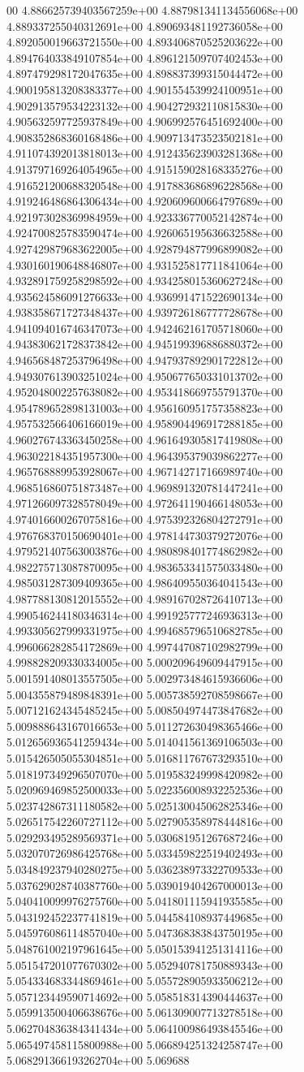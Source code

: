 00	4.886625739403567259e+00	4.887981341134556068e+00	4.889337255040312691e+00	4.890693481192736058e+00	4.892050019663721550e+00	4.893406870525203622e+00	4.894764033849107854e+00	4.896121509707402453e+00	4.897479298172047635e+00	4.898837399315044472e+00	4.900195813208383377e+00	4.901554539924100951e+00	4.902913579534223132e+00	4.904272932110815830e+00	4.905632597725937849e+00	4.906992576451692400e+00	4.908352868360168486e+00	4.909713473523502181e+00	4.911074392013818013e+00	4.912435623903281368e+00	4.913797169264054965e+00	4.915159028168335276e+00	4.916521200688320548e+00	4.917883686896228568e+00	4.919246486864306434e+00	4.920609600664797689e+00	4.921973028369984959e+00	4.923336770052142874e+00	4.924700825783590474e+00	4.926065195636632588e+00	4.927429879683622005e+00	4.928794877996899082e+00	4.930160190648846807e+00	4.931525817711841064e+00	4.932891759258298592e+00	4.934258015360627248e+00	4.935624586091276633e+00	4.936991471522690134e+00	4.938358671727348437e+00	4.939726186777728678e+00	4.941094016746347073e+00	4.942462161705718060e+00	4.943830621728373842e+00	4.945199396886880372e+00	4.946568487253796498e+00	4.947937892901722812e+00	4.949307613903251024e+00	4.950677650331013702e+00	4.952048002257638082e+00	4.953418669755791370e+00	4.954789652898131003e+00	4.956160951757358823e+00	4.957532566406166019e+00	4.958904496917288185e+00	4.960276743363450258e+00	4.961649305817419808e+00	4.963022184351957300e+00	4.964395379039862277e+00	4.965768889953928067e+00	4.967142717166989740e+00	4.968516860751873487e+00	4.969891320781447241e+00	4.971266097328578049e+00	4.972641190466148053e+00	4.974016600267075816e+00	4.975392326804272791e+00	4.976768370150690401e+00	4.978144730379272076e+00	4.979521407563003876e+00	4.980898401774862982e+00	4.982275713087870095e+00	4.983653341575033480e+00	4.985031287309409365e+00	4.986409550364041543e+00	4.987788130812015552e+00	4.989167028726410713e+00	4.990546244180346314e+00	4.991925777246936313e+00	4.993305627999331975e+00	4.994685796510682785e+00	4.996066282854172869e+00	4.997447087102982799e+00	4.998828209330334005e+00	5.000209649609447915e+00	5.001591408013557505e+00	5.002973484615936606e+00	5.004355879489848391e+00	5.005738592708598667e+00	5.007121624345485245e+00	5.008504974473847682e+00	5.009888643167016653e+00	5.011272630498365466e+00	5.012656936541259434e+00	5.014041561369106503e+00	5.015426505055304851e+00	5.016811767673293510e+00	5.018197349296507070e+00	5.019583249998420982e+00	5.020969469852500033e+00	5.022356008932252536e+00	5.023742867311180582e+00	5.025130045062825346e+00	5.026517542260727112e+00	5.027905358978444816e+00	5.029293495289569371e+00	5.030681951267687246e+00	5.032070726986425768e+00	5.033459822519402493e+00	5.034849237940280275e+00	5.036238973322709533e+00	5.037629028740387760e+00	5.039019404267000013e+00	5.040410099976275760e+00	5.041801115941935585e+00	5.043192452237741819e+00	5.044584108937449685e+00	5.045976086114857040e+00	5.047368383843750195e+00	5.048761002197961645e+00	5.050153941251314116e+00	5.051547201077670302e+00	5.052940781750889343e+00	5.054334683344869461e+00	5.055728905933506212e+00	5.057123449590714692e+00	5.058518314390444637e+00	5.059913500406638676e+00	5.061309007713278518e+00	5.062704836384341434e+00	5.064100986493845546e+00	5.065497458115800988e+00	5.066894251324258747e+00	5.068291366193262704e+00	5.069688